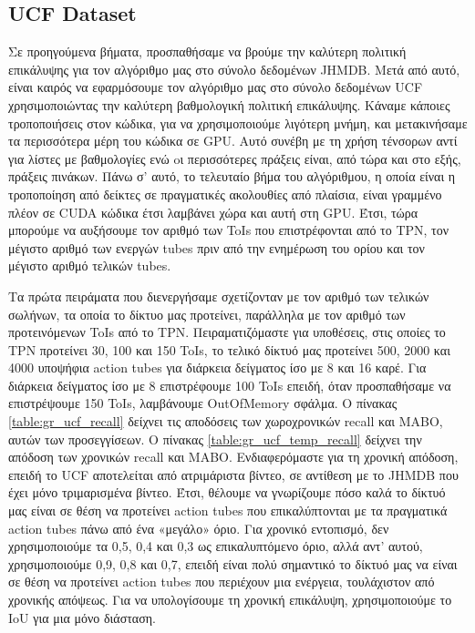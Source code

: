\subsection {\en UCF Dataset\gr}
Σε προηγούμενα βήματα, προσπαθήσαμε να βρούμε την καλύτερη πολιτική επικάλυψης για τον αλγόριθμο μας στο σύνολο δεδομένων \en  JHMDB\gr.
Μετά από αυτό, είναι καιρός να εφαρμόσουμε τον αλγόριθμο μας στο σύνολο δεδομένων \en UCF \gr χρησιμοποιώντας την καλύτερη βαθμολογική
πολιτική επικάλυψης. Κάναμε κάποιες τροποποιήσεις στον κώδικα, για να χρησιμοποιούμε λιγότερη μνήμη, και μετακινήσαμε τα περισσότερα μέρη του κώδικα σε \en GPU\gr. Αυτό συνέβη με τη χρήση τένσορων αντί για  λίστες με βαθμολογίες ενώ oι περισσότερες πράξεις είναι, από τώρα και στο εξής,
πράξεις πινάκων. Πάνω σ' αυτό, το τελευταίο βήμα του αλγόριθμου, η οποία είναι η τροποποίηση από δείκτες σε πραγματικές ακολουθίες από
πλαίσια, είναι γραμμένο πλέον σε \en CUDA \gr κώδικα έτσι λαμβάνει χώρα και αυτή στη \en GPU\gr. Έτσι, τώρα μπορούμε να αυξήσουμε τον αριθμό των \en ToIs \gr που επιστρέφονται από το \en TPN\gr, τον μέγιστο αριθμό των ενεργών \en tubes \gr πριν από την ενημέρωση του ορίου και τον μέγιστο αριθμό τελικών
\en tubes\gr.  \par
Τα πρώτα πειράματα που διενεργήσαμε σχετίζονταν με τον αριθμό των τελικών σωλήνων, τα οποία το δίκτυο μας προτείνει, παράλληλα με τον αριθμό
των προτεινόμενων \en ToIs \gr  από  το \en TPN\gr. Πειραματιζόμαστε για υποθέσεις, στις οποίες το TPN προτείνει 30, 100 και 150 \en ToIs\gr, το τελικό δίκτυό μας προτείνει 500, 2000 και 4000 υποψήφια \en action tubes \gr για
διάρκεια δείγματος ίσο με 8 και 16 καρέ. Για διάρκεια δείγματος ίσο με 8 επιστρέφουμε 100 \en ToIs \gr επειδή, όταν
προσπαθήσαμε να επιστρέψουμε 150 \en ToIs\gr, λαμβάνουμε \en OutOfMemory \gr σφάλμα.
O πίνακας \ref{table:gr_ucf_recall} δείχνει τις αποδόσεις των χωροχρονικών \en recall \gr και \en MABO\gr,  αυτών των προσεγγίσεων.
O πίνακας \ref{table:gr_ucf_temp_recall} δείχνει την απόδοση των χρονικών \en recall \gr και \en MABO\gr.
Ενδιαφερόμαστε για τη χρονική απόδοση, επειδή το \en UCF  \gr αποτελείται από ατριμάριστα βίντεο, σε αντίθεση με το \en JHMDB \gr
που έχει μόνο τριμαρισμένα βίντεο. Έτσι, θέλουμε να γνωρίζουμε πόσο καλά το δίκτυό μας είναι σε θέση να προτείνει \en action tubes \gr που
επικαλύπτονται με τα πραγματικά \en action tubes \gr πάνω από ένα «μεγάλο» όριο.
Για χρονικό εντοπισμό, δεν χρησιμοποιούμε τα 0,5, 0,4 και 0,3 ως επικαλυπτόμενο όριο, αλλά αντ' αυτού, χρησιμοποιούμε 0,9, 0,8 και 0,7,
επειδή είναι πολύ σημαντικό το δίκτυό μας να είναι σε θέση να προτείνει \en action tubes \gr που
περιέχουν μια ενέργεια, τουλάχιστον από χρονικής απόψεως.
Για να υπολογίσουμε τη χρονική επικάλυψη, χρησιμοποιούμε το \en IoU \gr για μια μόνο διάσταση.

